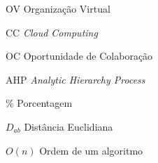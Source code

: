 \documentclass[
	12pt,				%
	openright,			%
	oneside,			
	a4paper,			%
	chapter=TITLE,		%
	section=TITLE,		%
	english,			%
	brazil,				%
	]{abntex2}
\begin{document}


\begin{siglas}
  \SingleSpacing
  \item[OV]       Organização Virtual
  \item[CC]       \textit{Cloud Computing}
  \item[OC]       Oportunidade de Colaboração
  \item[AHP]      \textit{Analytic Hierarchy Process}
\end{siglas}

\begin{simbolos}
	\SingleSpacing
	\item[\%] Porcentagem
	\item[$D_{ab}$] Distância Euclidiana
	\item[$O(n)$] Ordem de um algoritmo
\end{simbolos}


\tableofcontents*
\cleardoublepage

\textual

\pagestyle{eudesc}





% 

\postextual



%
%

\begin{apendicesenv}
	
\end{apendicesenv}

\begin{anexosenv}
	
\end{anexosenv}
\end{document}

